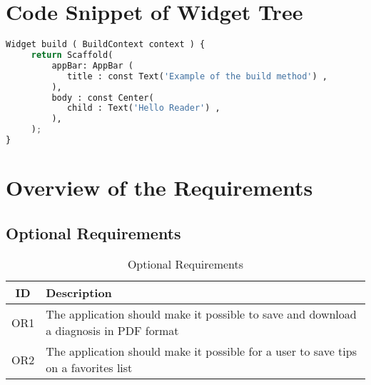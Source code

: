\chapter{Code Snippet of Widget Tree}
\begin{lstlisting}[language=Python, caption={Code Snipped of Widget Tree}]
Widget build ( BuildContext context ) {
	 return Scaffold(
		 appBar: AppBar (
		 	title : const Text('Example of the build method') ,
	 	 ),
		 body : const Center(
		 	child : Text('Hello Reader') ,
		 ),
	 );
}
\end{lstlisting}
\pagebreak


\chapter{Overview of the Requirements}
\section{Optional Requirements}
\begin{table}[H]
	\begin{center}
		\scriptsize
		\def\arraystretch{2}%
		\begin{tabular}{ c|l }
			\hline
			\textbf{ID} & \textbf{Description}  \\
			\hline
			OR1 & The application should make it possible to save and download a diagnosis in PDF format  \\
			\hline
			OR2 & The application should make it possible for a user to save tips on a favorites list  \\
			\hline	
		\end{tabular}
		\normalsize
	\end{center}
	\caption{Optional Requirements}
\end{table}
